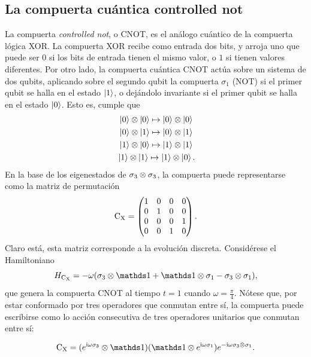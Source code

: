 \subsection{La compuerta cuántica controlled not}

La compuerta \textit{controlled not}, o CNOT, es el análogo cuántico de la compuerta lógica XOR. La compuerta XOR recibe como entrada dos bits, y arroja uno que puede ser $0$ si los bits de entrada tienen el mismo valor, o $1$ si tienen valores diferentes. Por otro lado, la compuerta cuántica CNOT actúa sobre un sistema de dos qubits, aplicando sobre el segundo qubit la compuerta $\sigma_{1}$ (NOT) si el primer qubit se halla en el estado $\ket{1}$, o dejándolo invariante si el primer qubit se halla en el estado $\ket{0}$. Esto es, cumple que \cite{Chuang}
\begin{align*}
    \ket{0}\otimes\ket{0}\mapsto\ket{0}\otimes\ket{0}\\
    \ket{0}\otimes\ket{1}\mapsto\ket{0}\otimes\ket{1}\\
    \ket{1}\otimes\ket{0}\mapsto\ket{1}\otimes\ket{1}\\
    \ket{1}\otimes\ket{1}\mapsto\ket{1}\otimes\ket{0} \rlap{.}
\end{align*}
En la base de los eigenestados de $\sigma_{3}\otimes\sigma_{3}$, la compuerta puede representarse como la matriz de permutación
\begin{equation*}
    \text{C}_{\text{X}}=\begin{pmatrix}
        1&0&0&0\\
        0&1&0&0\\
        0&0&0&1\\
        0&0&1&0
    \end{pmatrix}.
\end{equation*}
Claro está, esta matriz corresponde a la evolución discreta. Considérese el Hamiltoniano
\begin{equation*}
  H_{\cnot}=-\omega(\pauli{3}\otimes\Id+\Id\otimes\pauli{1}-\pauli{3}\otimes\pauli{1}),
\end{equation*}
que genera la compuerta CNOT al tiempo $t=1$ cuando $\omega=\frac{\pi}{4}$. Nótese que, por estar conformado por tres operadores que conmutan entre sí, la compuerta puede escribirse como lo acción consecutiva de tres operadores unitarios que conmutan entre sí:

\begin{equation*}
  \cnot=(e^{\rmi\omega\pauli{3}}\otimes \Id) (\Id \otimes e^{\rmi\omega\pauli{1}}) e^{-\rmi\omega\pauli{3}\otimes\pauli{1}}.
\end{equation*}

